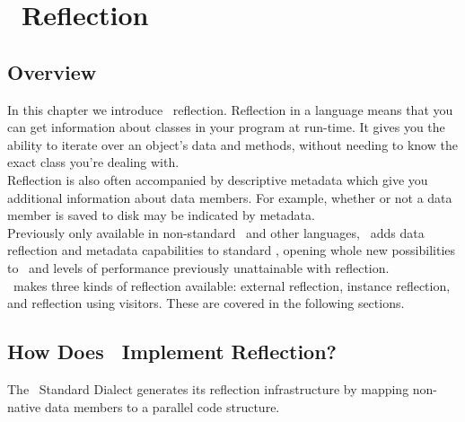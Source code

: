 
\chapter{\opCPP\ Reflection}
\label{chap:opcpp_reflection}

\section{Overview}
\label{sec:reflection_overview}

In this chapter we introduce \opCPP\ reflection.  Reflection in a language means that you can get information about classes in your program at run-time. It gives you the ability to iterate over an object's data and methods, without needing to know the exact class you're dealing with. \\

Reflection is also often accompanied by descriptive metadata which give you additional information about data members. For example, whether or not a data member is saved to disk may be indicated by metadata. \\

Previously only available in non-standard \cpp\ and other languages, \opCPP\ adds data reflection and metadata capabilities to standard \cpp, opening whole new possibilities to \cpp\ and levels of performance previously unattainable with reflection. \\

\opCPP\ makes three kinds of reflection available: external reflection, instance reflection, and reflection using visitors.  These are covered in the following sections.

\section{How Does \opCPP\ Implement Reflection?}
\label{sec:reflection_how_is_it_implemented}

The \opCPP\ Standard Dialect generates its reflection infrastructure by mapping non-native data members to a parallel code structure.

